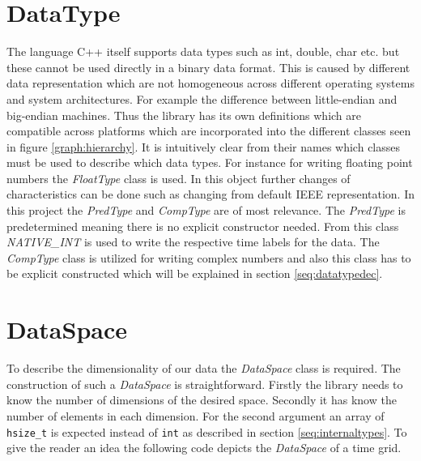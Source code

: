 \section{DataType}
The language C++ itself supports data types such as int, double, char etc. but these cannot be used directly in a binary data format.
This is caused by different data representation which are not homogeneous across different operating systems and system architectures. For example the difference between little-endian and big-endian machines. Thus the library has its own definitions which are compatible across platforms which are incorporated into the different classes seen in figure \ref{graph:hierarchy}. It is intuitively clear from their names which classes must be used to describe which data types. For instance for writing floating point numbers the \textit{FloatType} class is used. In this object further changes of characteristics can be done such as changing from default IEEE representation. In this project the \textit{PredType} and \textit{CompType} are of most relevance. The \textit{PredType} is predetermined meaning there is no explicit constructor needed. From this class \textit{NATIVE_INT} is used to write the respective time labels for the data. The \textit{CompType} class is utilized for writing complex numbers and also this class has to be explicit constructed which will be explained in section \ref{seq:datatypedec}.

\section{DataSpace}
To describe the dimensionality of our data the \textit{DataSpace} class is required. The construction of such a \textit{DataSpace} is straightforward. Firstly the library needs to know the number of dimensions of the desired space. Secondly it has know the number of elements in each dimension. For the second argument an array of \texttt{hsize\_t} is expected instead of \texttt{int} as described in section \ref{seq:internaltypes}. To give the reader an idea the following code depicts the \textit{DataSpace} of a time grid.

